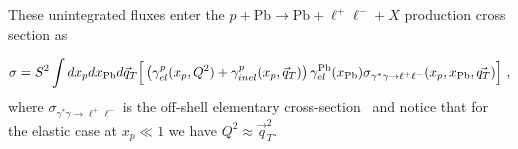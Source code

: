 \documentclass[a4paper,10pt]{article}
\begin{document}
These unintegrated fluxes enter the $p+\textrm{Pb}\rightarrow \textrm{Pb} + \ell^+\ell^- + X$ production cross section as

\begin{equation}
\sigma = S^2 \int dx_p dx_{\rm Pb} d\vec{q}_T \Big[
\left ( \gamma^{p}_{el}(x_p, Q^2) + \gamma^{p}_{inel}(x_p,\vec{q}_T) \right)
 \gamma^{\rm Pb}_{el}(x_{\rm Pb})
\sigma_{\gamma^{*}  \gamma \rightarrow \ell^+ \ell^-}(x_p, x_{\rm Pb}, \vec{q_T})  \Big]~,
\label{kt_factorization_formula}
\end{equation}
%
where $\sigma_{\gamma^{*} \gamma \rightarrow \ell^+ \ell^-}$ is the off-shell elementary cross-section~\cite{daSilveira:2014jla} and 
notice that for the elastic case at $x_p \ll 1$ we have $Q^2 \approx \vec{q}_T^2$.
\end{document}
